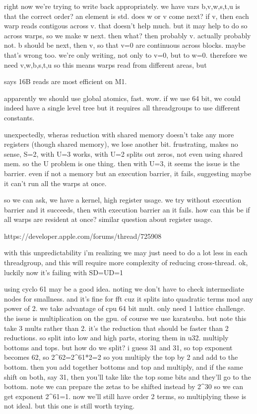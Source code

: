 right now we're trying to write back appropriately.
we have vars b,v,w,s,t,u
is that the correct order?
an element is std. does w or v come next? 
if v, then each warp reads contigous across v. that doesn't help much.
but it may help to do so across warps, so we make w next.
then what? then probably v. actually probably not. b should be next, then v, so that v=0 are continuous across blocks. 
maybe that's wrong too. we're only writing, not only to v=0, but to w=0. therefore we need
v,w,b,s,t,u
so this means warps read from different areas, but 


says 16B reads are most efficient on M1.



apparently we should use global atomics, fast. wow. if we use 64 bit, we could indeed have a single level tree but it requires all threadgroups to use different constants. 


unexpectedly, wheras reduction with shared memory doesn't take any more registers (though shared memory), we lose another bit. 
frustrating, makes no sense, S=2, with U=3 works, with U=2 splits out zeros, not even using shared mem. 
so the U problem is one thing.
then with U=3, it seems the issue is the barrier. even if not a memory but an execution barrier, it fails, suggesting maybe it can't run all the warps at once. 

so we can ask, we have a kernel, high register usage.
we try without execution barrier and it succeeds, then with execution barrier an it fails. how can this be if all warps are resident at once?
similar question about register usage.

https://developer.apple.com/forums/thread/725908

with this unpredictability i'm realizing we may just need to do a lot less in each threadgroup, and this will require more complexity of reducing cross-thread. 
ok, luckily now it's failing with SD=UD=1



using cyclo 61 may be a good idea. noting we don't have to check intermediate nodes for smallness.
and it's fine for fft cuz it splits into quadratic terms mod any power of 2. 
we take advantage of cpu 64 bit mult. only need 1 lattice challenge. the issue is multiplication on the gpu. of course we use karatsuba. but note this take 3 mults rather than 2. it's the reduction that should be faster than 2 reductions. so split into low and high parts, storing them in u32. multiply bottoms and tops. but how do we split? i guess 31 and 31, so top exponent becomes 62, so 2^62=2^61*2=2 so you multiply the top by 2 and add to the bottom. then you add together bottoms and top and multiply, and if the same shift on both, say 31, then you'll take like the top some bits and they'll go to the bottom. 
note we can prepare the zetas to be shifted instead by 2^30 so we can get exponent 2^61=1.
now we'll still have order 2 terms, so multiplying these is not ideal. but this one is still worth trying. 



